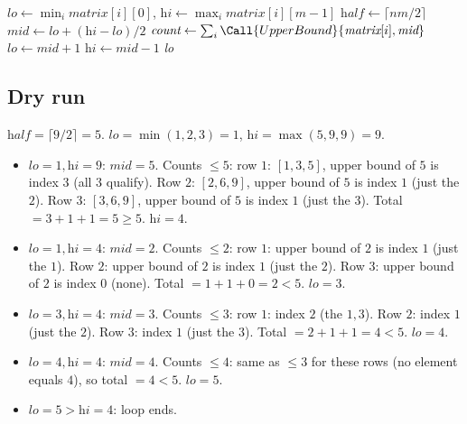 \begin{algorithm}[H]
\caption{Median of a Row-wise Sorted Matrix}
\begin{algorithmic}[1]
  \State $\textit{lo} \gets \min_i \textit{matrix}[i][0]$, $\textit{hi} \gets \max_i \textit{matrix}[i][m-1]$
  \State $\textit{half} \gets \lceil nm/2 \rceil$
    \State $\textit{mid} \gets \textit{lo}+(\textit{hi}-\textit{lo})/2$
    \State $\textit{count} \gets \sum_i \Call{UpperBound}{\textit{matrix}[i], \textit{mid}}$
      \State $\textit{lo} \gets \textit{mid} + 1$
    \Else
      \State $\textit{hi} \gets \textit{mid} - 1$
    \EndIf
  \EndWhile
  \State \Return \textit{lo}
\EndProcedure
\end{algorithmic}
\end{algorithm}

\subsection*{Dry run}


$\textit{half} = \lceil 9/2 \rceil = 5$. $\textit{lo}=\min(1,2,3)=1$,
$\textit{hi}=\max(5,9,9)=9$.

\begin{itemize}
  \item $\textit{lo}=1,\textit{hi}=9$: $\textit{mid}=5$. Counts $\le 5$:
        row $1$: $[1,3,5]$, upper bound of $5$ is index $3$ (all $3$
        qualify). Row $2$: $[2,6,9]$, upper bound of $5$ is index $1$
        (just the $2$). Row $3$: $[3,6,9]$, upper bound of $5$ is index
        $1$ (just the $3$). Total $=3+1+1=5 \ge 5$. $\textit{hi}=4$.
  \item $\textit{lo}=1,\textit{hi}=4$: $\textit{mid}=2$. Counts $\le 2$:
        row $1$: upper bound of $2$ is index $1$ (just the $1$). Row $2$:
        upper bound of $2$ is index $1$ (just the $2$). Row $3$: upper
        bound of $2$ is index $0$ (none). Total $=1+1+0=2 < 5$.
        $\textit{lo}=3$.
  \item $\textit{lo}=3,\textit{hi}=4$: $\textit{mid}=3$. Counts $\le 3$:
        row $1$: index $2$ (the $1,3$). Row $2$: index $1$ (just the
        $2$). Row $3$: index $1$ (just the $3$). Total $=2+1+1=4 < 5$.
        $\textit{lo}=4$.
  \item $\textit{lo}=4,\textit{hi}=4$: $\textit{mid}=4$. Counts $\le 4$:
        same as $\le 3$ for these rows (no element equals $4$), so total
        $=4 < 5$. $\textit{lo}=5$.
  \item $\textit{lo}=5 > \textit{hi}=4$: loop ends.
\end{itemize}

